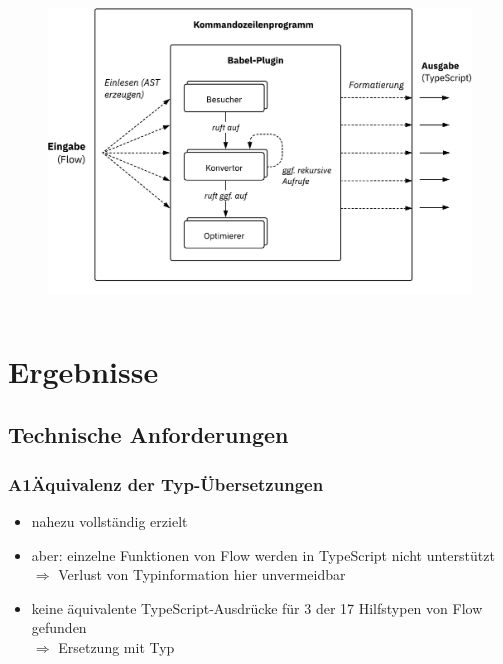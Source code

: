     \begin{frame}
      \vspace{1mm}
      \begin{columns}
        \column{\dimexpr\paperwidth-8mm}
        \begin{figure}
          \includegraphics[width=\textwidth]{src/figures/architecture-overview.pdf}
        \end{figure}
      \end{columns}
    \end{frame}

  \section{Ergebnisse}

    \subsection{Technische Anforderungen}
      \begin{frame}
        \frametitle{A1\hspace{0.75em}Äquivalenz der Typ-Übersetzungen}
        \begin{itemize}
          \item nahezu vollständig erzielt
          \item aber: einzelne Funktionen von Flow werden in TypeScript nicht unterstützt\\
            \smallskip
            $\Rightarrow$ Verlust von Typinformation hier unvermeidbar
          \item keine äquivalente TypeScript-Ausdrücke für 3 der 17 Hilfstypen von Flow gefunden\\
            \smallskip
            $\Rightarrow$ Ersetzung mit Typ 
        \end{itemize}
      \end{frame}

